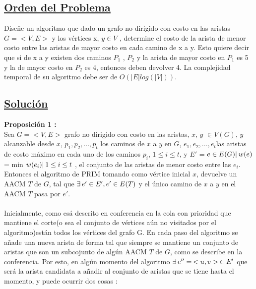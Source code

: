 \documentclass{article}
\begin{document}
    \subsection{\underline{Orden del Problema}}
    
    Dise\~ne un algoritmo que dado un grafo no dirigido con costo en las aristas $G = <V, E>$ y los v\'ertices x, $y \in  V$ ,
    determine el costo de la arista de menor costo entre las aristas de mayor costo en cada camino de x a y. Esto
    quiere decir que si de x a y existen dos caminos $P_1$ , $P_2$ y la arista de mayor costo en $P_1$ es 5 y la de mayor costo
    en $P_2$ es 4, entonces deben devolver 4. La complejidad temporal de su algoritmo debe ser de $O(|E|log(|V|))$.\\

    \subsection{\underline{Soluci\'on}}

    \noindent \textbf{Proposici\'on 1 :} \\
    
    Sea $G = <V,E>$ grafo no dirigido con costo en las aristas, $x$, $y$ $\in V(G)$, $y$ alcanzable desde $x$, \textbraceleft$p_1, p_2,..., p_t$\textbraceright 
    los caminos de $x$ a $y$ en $G$, \textbraceleft$e_1, e_2,..., e_t$\textbraceright las aristas de costo m\'aximo en cada uno de los caminos $p_i$, $1 \leq i \leq t$, y
    $E'$ = \textbraceleft $e \in E(G) |\hspace{0.2em} w(e)$ = min \textbraceleft $w(e_i) |\hspace{0.2em} 1 \leq i \leq t$ \textbraceright \textbraceright, el conjunto
    de las aristas de menor costo entre las $e_i$. Entonces el algoritmo de PRIM tomando como v\'ertice inicial $x$, devuelve un AACM $T$ de $G$, tal que $\exists\hspace{0.2em}
    e' \in E', e' \in E(T)$ y el \'unico camino de $x$ a $y$ en el AACM $T$ pasa por $e'$.\\\\
    
    Inicialmente, como es\'a descrito en conferencia en la cola con prioridad que mantiene el corte(o sea el conjunto de v\'ertices a\'un no visitados por el algoritmo)est\'an todos los 
    v\'ertices del grafo G. En cada paso del algoritmo se a\~nade una nueva arista de forma tal que siempre se mantiene un conjunto de aristas que son un subcojunto de alg\'un AACM $T$ de $G$,
    como se describe en la conferencia. Por esto, en alg\'un momento del algoritmo $\exists\hspace{0.2em} e'' = \hspace{0.2em}<u,v>\hspace{0.2em} \in E'$ que ser\'a la arista candidata a 
    a\~nadir al conjunto de aristas que se tiene hasta el momento, y puede ocurrir dos cosas :\\\\
    
\end{document}
